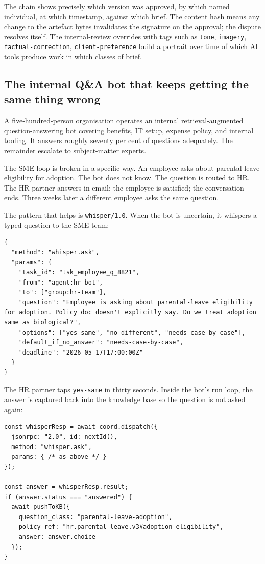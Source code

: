\documentclass[11pt]{article}
\begin{document}
The chain shows precisely which version was approved, by which named individual, at which timestamp, against which brief. The content hash means any change to the artefact bytes invalidates the signature on the approval; the dispute resolves itself. The internal-review overrides with tags such as \texttt{tone}, \texttt{imagery}, \texttt{factual-correction}, \texttt{client-preference} build a portrait over time of which AI tools produce work in which classes of brief.

\subsection{The internal Q\&A bot that keeps getting the same thing wrong}

A five-hundred-person organisation operates an internal retrieval-augmented question-answering bot covering benefits, IT setup, expense policy, and internal tooling. It answers roughly seventy per cent of questions adequately. The remainder escalate to subject-matter experts.

The SME loop is broken in a specific way. An employee asks about parental-leave eligibility for adoption. The bot does not know. The question is routed to HR. The HR partner answers in email; the employee is satisfied; the conversation ends. Three weeks later a different employee asks the same question.

The pattern that helps is \texttt{whisper/1.0}. When the bot is uncertain, it whispers a typed question to the SME team:

\begin{lstlisting}[caption={Whisper with typed options and a default.},label={lst:case9-whisper}]
{
  "method": "whisper.ask",
  "params": {
    "task_id": "tsk_employee_q_8821",
    "from": "agent:hr-bot",
    "to": ["group:hr-team"],
    "question": "Employee is asking about parental-leave eligibility for adoption. Policy doc doesn't explicitly say. Do we treat adoption same as biological?",
    "options": ["yes-same", "no-different", "needs-case-by-case"],
    "default_if_no_answer": "needs-case-by-case",
    "deadline": "2026-05-17T17:00:00Z"
  }
}
\end{lstlisting}

The HR partner taps \texttt{yes-same} in thirty seconds. Inside the bot's run loop, the answer is captured back into the knowledge base so the question is not asked again:

\begin{lstlisting}[caption={Bot consumes whisper response into its policy KB.},label={lst:case9-loop}]
const whisperResp = await coord.dispatch({
  jsonrpc: "2.0", id: nextId(),
  method: "whisper.ask",
  params: { /* as above */ }
});

const answer = whisperResp.result;
if (answer.status === "answered") {
  await pushToKB({
    question_class: "parental-leave-adoption",
    policy_ref: "hr.parental-leave.v3#adoption-eligibility",
    answer: answer.choice
  });
}
\end{lstlisting}
\end{document}
